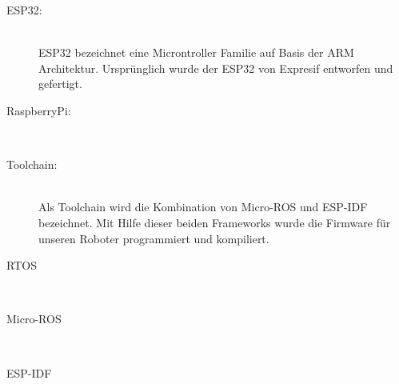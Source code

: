 \begin{flushleft}
\begin{description}
        \item[ESP32:]\hfill\\
        ESP32 bezeichnet eine Microntroller Familie auf Basis der ARM Architektur.
        Ursprünglich wurde der ESP32 von Expresif entworfen und gefertigt.

        \item[RaspberryPi:]\hfill\\
        
        \item[Toolchain:] \hfill\\
        Als Toolchain wird die Kombination von Micro-ROS und ESP-IDF bezeichnet.
        Mit Hilfe dieser beiden Frameworks wurde die Firmware für unseren Roboter programmiert und kompiliert.

        \item[RTOS]\hfill\\
        \item[Micro-ROS]\hfill\\
        \item[ESP-IDF]\hfill\\

        \end{description}
\end{flushleft}